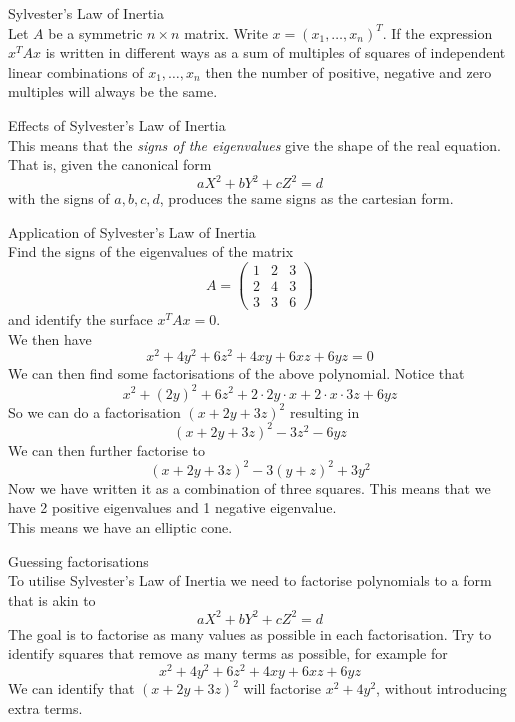 \documentclass[journal, letterpaper]{IEEEtran}
\begin{document}
    \begin{mybox}{Sylvester's Law of Inertia} \\ 
        Let $A$ be a symmetric $n \times n$ matrix. Write $x = (x_1, \dots, x_n)^T$. If the expression $x^TAx$ 
        is written in different ways as a sum of multiples of squares of independent linear combinations of 
        $x_1, \dots, x_n$ then the number of positive, negative and zero multiples will always be the same.
    \end{mybox}
    \begin{myboxr}{Effects of Sylvester's Law of Inertia} \\
        This means that the \textit{signs of the eigenvalues} give the shape of the real equation. That is,
        given the canonical form
        $$ aX^2 + bY^2 + cZ^2 = d$$
        with the signs of $a, b, c, d$, produces the same signs as the cartesian form.
    \end{myboxr}
    \begin{myboxg}{Application of Sylvester's Law of Inertia} \\
        Find the signs of the eigenvalues of the matrix
        $$ A = \begin{pmatrix}
            1 & 2 & 3 \\ 2 & 4 & 3 \\ 3 & 3 & 6
        \end{pmatrix}$$
        and identify the surface $x^TAx = 0$.
        \newline \\ 
        We then have 
        $$ x^2 + 4y^2 + 6z^2 + 4xy + 6xz + 6yz = 0$$
        We can then find some factorisations of the above polynomial. Notice that
        $$ x^2 + (2y)^2 + 6z^2 + 2 \cdot 2y \cdot x + 2\cdot x \cdot 3z + 6yz$$
        So we can do a factorisation $(x + 2y + 3z)^2$ resulting in
        $$ (x+2y+3z)^2 - 3z^2 - 6yz$$
        We can then further factorise to
        $$ (x+2y+3z)^2 - 3(y+z)^2 + 3y^2$$
        Now we have written it as a combination of three squares. This means that we have 2 positive eigenvalues
        and 1 negative eigenvalue.
        \newline \\ 
        This means we have an elliptic cone.
    \end{myboxg}
    \begin{myboxr}{Guessing factorisations} \\ 
        To utilise Sylvester's Law of Inertia we need to factorise polynomials to a form that is akin to
        $$ aX^2 + bY^2 + cZ^2 = d$$
        The goal is to factorise as many values as possible in each factorisation. Try to identify squares
        that remove as many terms as possible, for example for 
        $$ x^2 + 4y^2 + 6z^2 + 4xy + 6xz + 6yz $$
        We can identify that $(x + 2y + 3z)^2$ will factorise $x^2 + 4y^2$, without introducing extra terms.
    \end{myboxr}
\end{document}
